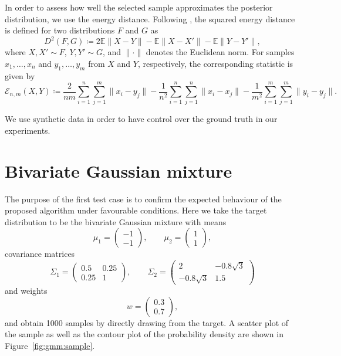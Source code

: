 \documentclass[11pt,a4paper]{report}
\begin{document}
In order to assess how well the selected sample approximates the posterior distribution, we use the energy distance. Following \cite{rizzoEnergyDistance2016}, the squared energy distance is defined for two distributions $F$ and $G$ as
$$D^2(F, G) \coloneq 2 \mathbb{E} \|X - Y\| - \mathbb{E}\|X - X'\| - \mathbb{E} \|Y - Y'\|,$$
where $X, X' \sim F$, $Y, Y' \sim G$, and $\|\cdot\|$ denotes the Euclidean norm. For samples $x_1, \dots, x_n$ and $y_1, \dots, y_m$ from $X$ and $Y$, respectively, the corresponding statistic is given by
\begin{equation}
\mathcal{E}_{n,m}(X, Y) \coloneq \frac{2}{nm}\sum_{i=1}^n \sum_{j=1}^m \|x_i - y_j\| - \frac{1}{n^2} \sum_{i=1}^n\sum_{j=1}^n \|x_i - x_j\| - \frac{1}{m^2} \sum_{i=1}^m \sum_{j=1}^m \|y_i - y_j\|.
\label{eq:energy-distance:discrete}
\end{equation}


We use synthetic data in order to have control over the ground truth in our experiments.

\section{Bivariate Gaussian mixture}

The purpose of the first test case is to confirm the expected behaviour of the proposed algorithm under favourable conditions. Here we take the target distribution to be the bivariate Gaussian mixture with means 
$$
\mu_1 = \begin{pmatrix} -1 \\ -1 \end{pmatrix}, \qquad
\mu_2 = \begin{pmatrix} 1 \\ 1 \end{pmatrix},
$$
covariance matrices
$$
\Sigma_1 = \begin{pmatrix}
0.5 & 0.25\\
0.25 & 1
\end{pmatrix}, \qquad
\Sigma_2 = \begin{pmatrix}
2 & -0.8 \sqrt{3}\\
-0.8 \sqrt{3} & 1.5
\end{pmatrix}
$$
and weights
$$w = \begin{pmatrix} 0.3 \\ 0.7 \end{pmatrix},$$
and obtain 1000 samples by directly drawing from the target. A scatter plot of the sample as well as the contour plot of the probability density are shown in Figure~\ref{fig:gmm:sample}.
\end{document}
